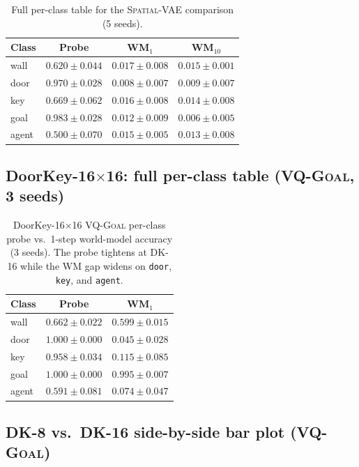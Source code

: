 \documentclass{article}
\newcommand{\encVQGoal}{\textsc{VQ-Goal}}
\newcommand{\encSpatialVAE}{\textsc{Spatial-VAE}}
\begin{document}
\begin{table}[h]
  \centering
  \caption{Full per-class table for the \encSpatialVAE{} comparison (5 seeds).}
  \label{tab:full-vae}
  \begin{tabular}{l c c c}
    \toprule
    Class & Probe & WM$_1$ & WM$_{10}$ \\
    \midrule
    wall  & $0.620\pm0.044$ & $0.017\pm0.008$ & $0.015\pm0.001$ \\
    door  & $0.970\pm0.028$ & $0.008\pm0.007$ & $0.009\pm0.007$ \\
    key   & $0.669\pm0.062$ & $0.016\pm0.008$ & $0.014\pm0.008$ \\
    goal  & $0.983\pm0.028$ & $0.012\pm0.009$ & $0.006\pm0.005$ \\
    agent & $0.500\pm0.070$ & $0.015\pm0.005$ & $0.013\pm0.008$ \\
    \bottomrule
  \end{tabular}
\end{table}

\subsection{DoorKey-16$\times$16: full per-class table (\encVQGoal, 3 seeds)}\label{app:dk16-table}

\begin{table}[h]
  \centering
  \caption{DoorKey-16$\times$16 \encVQGoal{} per-class probe vs.\ 1-step world-model accuracy (3 seeds). The probe tightens at DK-16 while the WM gap widens on \texttt{door}, \texttt{key}, and \texttt{agent}.}
  \label{tab:dk16-v6-table}
  \begin{tabular}{l c c}
    \toprule
    Class & Probe & WM$_1$ \\
    \midrule
    wall  & $0.662\pm0.022$ & $0.599\pm0.015$ \\
    door  & $1.000\pm0.000$ & $0.045\pm0.028$ \\
    key   & $0.958\pm0.034$ & $0.115\pm0.085$ \\
    goal  & $1.000\pm0.000$ & $0.995\pm0.007$ \\
    agent & $0.591\pm0.081$ & $0.074\pm0.047$ \\
    \bottomrule
  \end{tabular}
\end{table}

\subsection{DK-8 vs.\ DK-16 side-by-side bar plot (\encVQGoal)}
\end{document}
